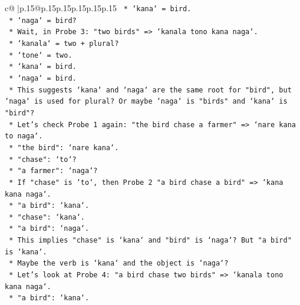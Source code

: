 \documentclass{article}
\begin{document}
{\begin{supertabular}{c@{$\;$}|p{.15\linewidth}@{}p{.15\linewidth}p{.15\linewidth}p{.15\linewidth}p{.15\linewidth}p{.15\linewidth}}
{{{\texttt{                                    *   `kana` = bird.} \\
\texttt{                                    *   `naga` = bird?} \\
\texttt{                                    *   Wait, in Probe 3: "two birds" => `kanala tono kana naga`.} \\
\texttt{                                        *   `kanala` = two + plural?} \\
\texttt{                                        *   `tone` = two.} \\
\texttt{                                        *   `kana` = bird.} \\
\texttt{                                        *   `naga` = bird.} \\
\texttt{                                    *   This suggests `kana` and `naga` are the same root for "bird", but `naga` is used for plural? Or maybe `naga` is "birds" and `kana` is "bird"?} \\
\texttt{                                    *   Let's check Probe 1 again: "the bird chase a farmer" => `nare kana to naga`.} \\
\texttt{                                        *   "the bird": `nare kana`.} \\
\texttt{                                        *   "chase": `to`?} \\
\texttt{                                        *   "a farmer": `naga`?} \\
\texttt{                                        *   If "chase" is `to`, then Probe 2 "a bird chase a bird" => `kana kana naga`.} \\
\texttt{                                            *   "a bird": `kana`.} \\
\texttt{                                            *   "chase": `kana`.} \\
\texttt{                                            *   "a bird": `naga`.} \\
\texttt{                                            *   This implies "chase" is `kana` and "bird" is `naga`? But "a bird" is `kana`.} \\
\texttt{                                            *   Maybe the verb is `kana` and the object is `naga`?} \\
\texttt{                                            *   Let's look at Probe 4: "a bird chase two birds" => `kanala tono kana naga`.} \\
\texttt{                                                *   "a bird": `kana`.} \\
}}}
\end{supertabular}}
\end{document}
